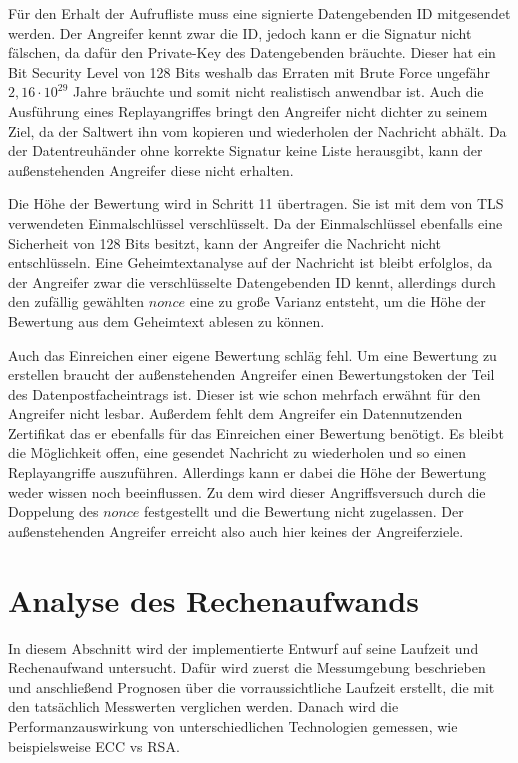 \documentclass[
	fontsize=12pt,
	headings=small,
	parskip=half,           %
	bibliography=totoc,
	numbers=noenddot,       %
	open=any,               %
]{scrreprt}
\begin{document}
Für den Erhalt der Aufrufliste muss eine signierte Datengebenden ID mitgesendet werden. Der Angreifer kennt zwar die ID, jedoch kann er die Signatur nicht fälschen, da dafür den Private-Key des Datengebenden bräuchte. Dieser hat ein Bit Security Level von 128 Bits weshalb das Erraten mit Brute Force ungefähr $2,16\cdot10^{29}$ Jahre bräuchte und somit nicht realistisch anwendbar ist. Auch die Ausführung eines Replayangriffes bringt den Angreifer nicht dichter zu seinem Ziel, da der Saltwert ihn vom kopieren und wiederholen der Nachricht abhält. Da der Datentreuhänder ohne korrekte Signatur keine Liste herausgibt, kann der außenstehenden Angreifer diese nicht erhalten.

Die Höhe der Bewertung wird in Schritt 11 übertragen. Sie ist mit dem von TLS verwendeten Einmalschlüssel verschlüsselt. Da der Einmalschlüssel ebenfalls eine Sicherheit von 128 Bits besitzt, kann der Angreifer die Nachricht nicht entschlüsseln. Eine Geheimtextanalyse auf der Nachricht ist bleibt erfolglos, da der Angreifer zwar die verschlüsselte Datengebenden ID kennt, allerdings durch den zufällig gewählten $nonce$ eine zu große Varianz entsteht, um die Höhe der Bewertung aus dem Geheimtext ablesen zu können.

Auch das Einreichen einer eigene Bewertung schläg fehl. Um eine Bewertung zu erstellen braucht der außenstehenden Angreifer einen Bewertungstoken der Teil des Datenpostfacheintrags ist. Dieser ist wie schon mehrfach erwähnt für den Angreifer nicht lesbar. Außerdem fehlt dem Angreifer ein Datennutzenden Zertifikat das er ebenfalls für das Einreichen einer Bewertung benötigt. Es bleibt die Möglichkeit offen, eine gesendet Nachricht zu wiederholen und so einen Replayangriffe auszuführen. Allerdings kann er dabei die Höhe der Bewertung weder wissen noch beeinflussen. Zu dem wird dieser Angriffsversuch durch die Doppelung des $nonce$ festgestellt und die Bewertung nicht zugelassen. Der außenstehenden Angreifer erreicht also auch hier keines der Angreiferziele.

\section{Analyse des Rechenaufwands}
\label{sec:computationTime}
In diesem Abschnitt wird der implementierte Entwurf auf seine Laufzeit und Rechenaufwand untersucht. Dafür wird zuerst die Messumgebung beschrieben und anschließend Prognosen über die vorraussichtliche Laufzeit erstellt, die mit den tatsächlich Messwerten verglichen werden. Danach wird die Performanzauswirkung von unterschiedlichen Technologien gemessen, wie beispielsweise ECC vs RSA.
\end{document}

